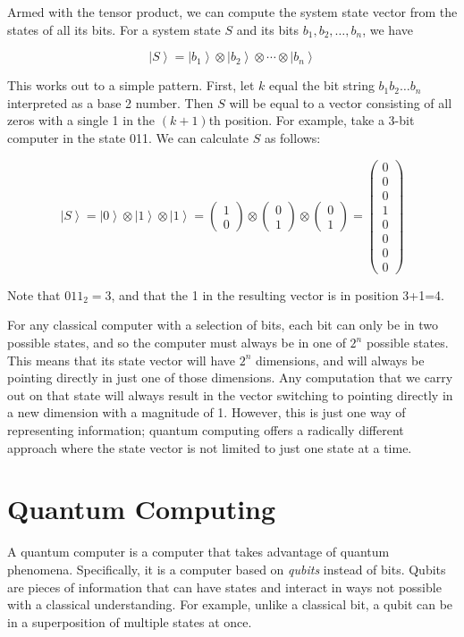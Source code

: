 \documentclass[11pt]{report}
\newcommand{\?}{\stackrel{?}{=}}
\newcommand{\qcol}[2]{\ensuremath{\begin{pmatrix} #1 \\ #2 \end{pmatrix}}}
\begin{document}
Armed with the tensor product, we can compute the system state vector from the states of all its bits. For a system state $S$ and its bits $b_1, b_2, \ldots, b_n$, we have

$$\left | S \right \rangle = \left | b_1 \right \rangle \otimes \left | b_2 \right \rangle \otimes \cdots \otimes \left | b_n \right \rangle$$

This works out to a simple pattern. First, let $k$ equal the bit string $b_1b_2\ldots b_n$ interpreted as a base 2 number. Then $S$ will be equal to a vector consisting of all zeros with a single 1 in the $(k+1)$th position. For example, take a 3-bit computer in the state 011. We can calculate $S$ as follows:

$$\left | S \right \rangle = \left | 0 \right \rangle \otimes \left | 1 \right \rangle \otimes \left | 1 \right \rangle = \qcol{1}{0} \otimes \qcol{0}{1} \otimes \qcol{0}{1} = \begin{pmatrix}0\\0\\0\\1\\0\\0\\0\\0\end{pmatrix}$$

Note that $011_2 = 3$, and that the 1 in the resulting vector is in position 3+1=4.

For any classical computer with a selection of bits, each bit can only be in two possible states, and so the computer must always be in one of $2^n$ possible states. This means that its state vector will have $2^n$ dimensions, and will always be pointing directly in just one of those dimensions. Any computation that we carry out on that state will always result in the vector switching to pointing directly in a new dimension with a magnitude of 1. However, this is just one way of representing information; quantum computing offers a radically different approach where the state vector is not limited to just one state at a time.

\section{Quantum Computing}
A quantum computer is a computer that takes advantage of quantum phenomena. Specifically, it is a computer based on \textit{qubits} instead of bits. Qubits are pieces of information that can have states and interact in ways not possible with a classical understanding. For example, unlike a classical bit, a qubit can be in a superposition of multiple states at once.
\end{document}
